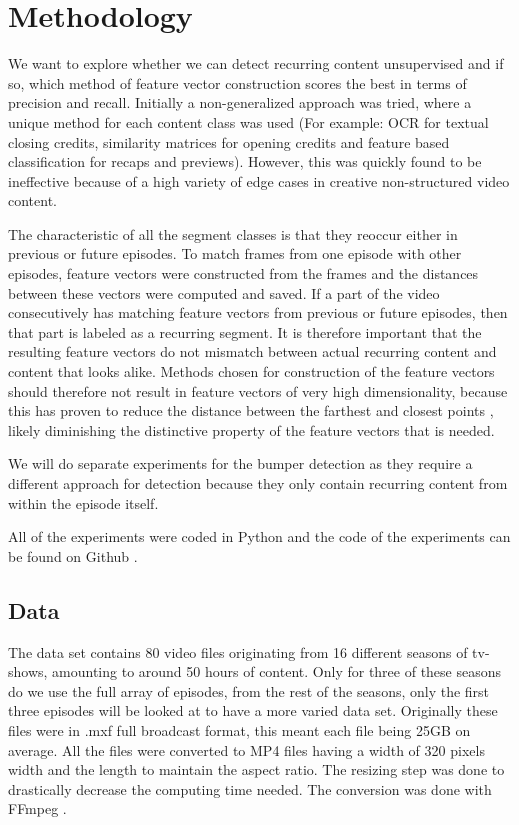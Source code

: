 \documentclass{article}
\begin{document}
\section{Methodology} \label{methodology}
We want to explore whether we can detect recurring content unsupervised and if so, which method of feature vector construction scores the best in terms of precision and recall. Initially a non-generalized approach was tried, where a unique method for each content class was used (For example: OCR for textual closing credits, similarity matrices for opening credits and feature based classification for recaps and previews). However, this was quickly found to be ineffective because of a high variety of edge cases in creative non-structured video content. 

The characteristic of all the segment classes is that they reoccur either in previous or future episodes. To match frames from one episode with other episodes, feature vectors were constructed from the frames and the distances between these vectors were computed and saved. If a part of the video consecutively has matching feature vectors from previous or future episodes, then that part is labeled as a recurring segment. It is therefore important that the resulting feature vectors do not mismatch between actual recurring content and content that looks alike. Methods chosen for construction of the feature vectors should therefore not result in feature vectors of very high dimensionality, because this has proven to reduce the distance between the farthest and closest points \cite{beyer1999nearest}, likely diminishing the distinctive property of the feature vectors that is needed.

We will do separate experiments for the bumper detection as they require a different approach for detection because they only contain recurring content from within the episode itself.

All of the experiments were coded in Python and the code of the experiments can be found on Github \cite{own-github}.
\subsection{Data}
The data set contains 80 video files originating from 16 different seasons of tv-shows, amounting to around 50 hours of content. Only for three of these seasons do we use the full array of episodes, from the rest of the seasons, only the first three episodes will be looked at to have a more varied data set. Originally these files were in .mxf full broadcast format, this meant each file being 25GB on average. All the files were converted to MP4 files having a width of 320 pixels width and the length to maintain the aspect ratio. The resizing step was done to drastically decrease the computing time needed. The conversion was done with FFmpeg \cite{ffmpeg}.
\end{document}
